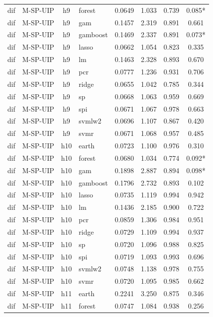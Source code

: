 \begin{ThreePartTable}
\begin{longtable}[t]{llclcccc}
dif & M-SP-UIP & h9 & forest & 0.0649 & 1.033 & 0.739 & 0.085*\\
dif & M-SP-UIP & h9 & gam & 0.1457 & 2.319 & 0.891 & 0.661\\
dif & M-SP-UIP & h9 & gamboost & 0.1469 & 2.337 & 0.891 & 0.073*\\
dif & M-SP-UIP & h9 & lasso & 0.0662 & 1.054 & 0.823 & 0.335\\
dif & M-SP-UIP & h9 & lm & 0.1463 & 2.328 & 0.893 & 0.670\\
dif & M-SP-UIP & h9 & pcr & 0.0777 & 1.236 & 0.931 & 0.706\\
dif & M-SP-UIP & h9 & ridge & 0.0655 & 1.042 & 0.785 & 0.344\\
dif & M-SP-UIP & h9 & sp & 0.0668 & 1.063 & 0.959 & 0.669\\
dif & M-SP-UIP & h9 & spi & 0.0671 & 1.067 & 0.978 & 0.663\\
dif & M-SP-UIP & h9 & svmlw2 & 0.0696 & 1.107 & 0.867 & 0.420\\
dif & M-SP-UIP & h9 & svmr & 0.0671 & 1.068 & 0.957 & 0.485\\
\addlinespace
dif & M-SP-UIP & h10 & earth & 0.0723 & 1.100 & 0.976 & 0.310\\
dif & M-SP-UIP & h10 & forest & 0.0680 & 1.034 & 0.774 & 0.092*\\
dif & M-SP-UIP & h10 & gam & 0.1898 & 2.887 & 0.894 & 0.098*\\
dif & M-SP-UIP & h10 & gamboost & 0.1796 & 2.732 & 0.893 & 0.102\\
dif & M-SP-UIP & h10 & lasso & 0.0735 & 1.119 & 0.994 & 0.942\\
dif & M-SP-UIP & h10 & lm & 0.1436 & 2.185 & 0.900 & 0.722\\
dif & M-SP-UIP & h10 & pcr & 0.0859 & 1.306 & 0.984 & 0.951\\
dif & M-SP-UIP & h10 & ridge & 0.0729 & 1.109 & 0.994 & 0.937\\
dif & M-SP-UIP & h10 & sp & 0.0720 & 1.096 & 0.988 & 0.825\\
dif & M-SP-UIP & h10 & spi & 0.0719 & 1.093 & 0.993 & 0.696\\
dif & M-SP-UIP & h10 & svmlw2 & 0.0748 & 1.138 & 0.978 & 0.755\\
dif & M-SP-UIP & h10 & svmr & 0.0720 & 1.095 & 0.985 & 0.662\\
\addlinespace
dif & M-SP-UIP & h11 & earth & 0.2241 & 3.250 & 0.875 & 0.346\\
dif & M-SP-UIP & h11 & forest & 0.0747 & 1.084 & 0.938 & 0.256\\

\end{longtable}
\end{ThreePartTable}
